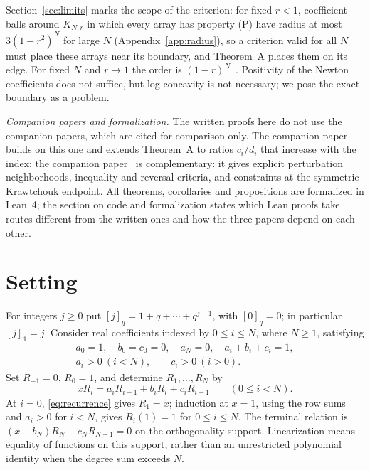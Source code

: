 Section~\ref{sec:limits} marks the scope of the criterion: for fixed $r<1$, coefficient balls around $K_{N,r}$ in which every array has property (P) have radius at most $3(1-r^2)^N$ for large $N$ (Appendix~\ref{app:radius}), so a criterion valid for all $N$ must place these arrays near its boundary, and Theorem~A places them on its edge. For fixed $N$ and $r\to1$ the order is $(1-r)^N$~\cite[Corollary~]{P3}. Positivity of the Newton coefficients does not suffice, but log-concavity is not necessary; we pose the exact boundary as a problem.

\emph{Companion papers and formalization.} The written proofs here do not use the companion papers, which are cited for comparison only. The companion paper~\cite{P2} builds on this one and extends Theorem~A to ratios $c_i/d_i$ that increase with the index; the companion paper~\cite{P3} is complementary: it gives explicit perturbation neighborhoods, inequality and reversal criteria, and constraints at the symmetric Krawtchouk endpoint. All theorems, corollaries and propositions are formalized in Lean~4; the section on code and formalization states which Lean proofs take routes different from the written ones and how the three papers depend on each other.

\section{Setting}\label{sec:criterion}

For integers $j\geq0$ put $[j]_q=1+q+\cdots+q^{j-1}$, with $[0]_q=0$; in particular $[j]_1=j$.
Consider real coefficients indexed by $0\leq i\leq N$, where $N\geq1$, satisfying
\begin{equation}\label{eq:basic}
\begin{gathered}
a_0=1,\quad b_0=c_0=0,\quad a_N=0,\quad a_i+b_i+c_i=1,\\
a_i>0\ (i<N),\qquad c_i>0\ (i>0).
\end{gathered}
\end{equation}
Set $R_{-1}=0$, $R_0=1$, and determine $R_1,\ldots,R_N$ by
\begin{equation}\label{eq:recurrence}
xR_i=a_iR_{i+1}+b_iR_i+c_iR_{i-1}\qquad(0\leq i<N).
\end{equation}
At $i=0$, \eqref{eq:recurrence} gives $R_1=x$; induction at $x=1$, using the row sums and $a_i>0$ for $i<N$, gives $R_i(1)=1$ for $0\leq i\leq N$.
The terminal relation is $(x-b_N)R_N-c_NR_{N-1}=0$ on the orthogonality support. Linearization means equality of functions on this support, rather than an unrestricted polynomial identity when the degree sum exceeds $N$.

